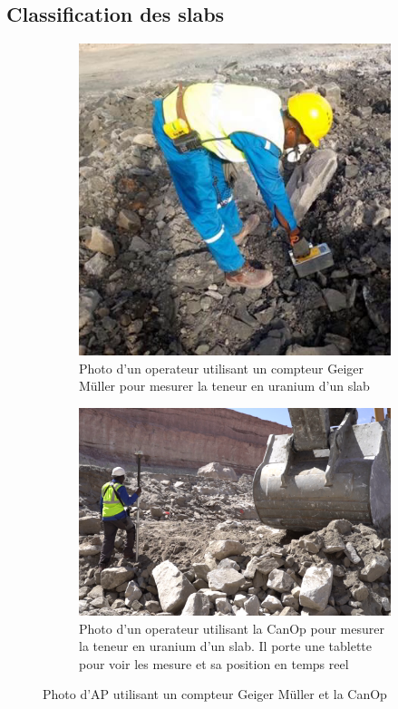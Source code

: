 \subsection{Classification des slabs}
\begin{figure}
    
    \begin{subfigure}[t]{0.4\textwidth}
        \centering
        \includegraphics[height=0.3\paperwidth]{img/photo/Travail_geiger.png}
        \caption{Photo d'un operateur utilisant un compteur Geiger Müller pour mesurer la teneur en uranium d'un slab}
        \label{fig_AP_geiger}
    \end{subfigure}
    \begin{subfigure}[t]{0.6\textwidth}
        \centering
        \includegraphics[height=0.3\paperwidth]{img/photo/CanOp_utilisation.png}
        \caption{Photo d'un operateur utilisant la CanOp pour mesurer la teneur en uranium d'un slab. Il porte une tablette pour voir les mesure et sa position en temps reel}
        \label{fig_AP_CanOp}
    \end{subfigure}
    \caption{Photo d'AP utilisant un compteur Geiger Müller et la CanOp}
\end{figure}

